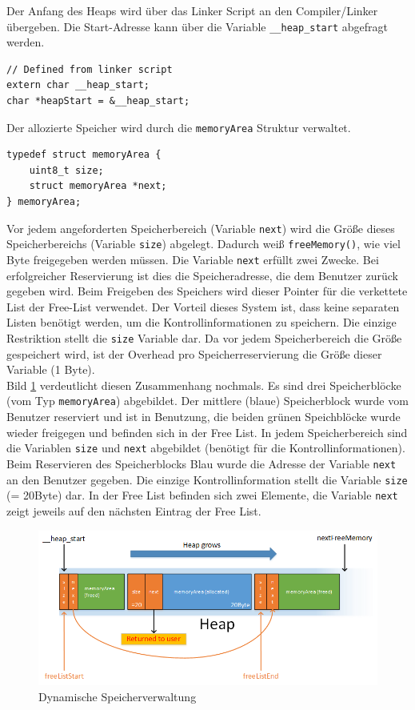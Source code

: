 \documentclass[fontsize=12pt, toc=bibliography, notitlepage]{scrreprt}
\begin{document}
Der Anfang des Heaps wird über das Linker Script an den Compiler/Linker übergeben. Die Start-Adresse kann über die Variable \lstinline$__heap_start$ abgefragt werden.

\begin{lstlisting}[title=memory.c]
// Defined from linker script
extern char __heap_start;
char *heapStart = &__heap_start;
\end{lstlisting}

Der allozierte Speicher wird durch die \lstinline$memoryArea$ Struktur verwaltet. 

\begin{lstlisting}[title=memory.c]
typedef struct memoryArea {
    uint8_t size;
    struct memoryArea *next;
} memoryArea;
\end{lstlisting}

Vor jedem angeforderten Speicherbereich (Variable \lstinline$next$) wird die Größe dieses Speicherbereichs (Variable \lstinline$size$) abgelegt. Dadurch weiß \lstinline$freeMemory()$, wie viel Byte freigegeben werden müssen. Die Variable \lstinline$next$ erfüllt zwei Zwecke. Bei erfolgreicher Reservierung ist dies die Speicheradresse, die dem Benutzer zurück gegeben wird. Beim Freigeben des Speichers wird dieser Pointer für die verkettete List der Free-List verwendet. Der Vorteil dieses System ist, dass keine separaten Listen benötigt werden, um die Kontrollinformationen zu speichern. Die einzige Restriktion stellt die \lstinline$size$ Variable dar. Da vor jedem Speicherbereich die Größe gespeichert wird, ist der Overhead pro Speicherreservierung die Größe dieser Variable (1 Byte). \\

Bild \ref{fig:memory} verdeutlicht diesen Zusammenhang nochmals. Es sind drei Speicherblöcke (vom Typ \lstinline$memoryArea$) abgebildet. Der mittlere (blaue) Speicherblock wurde vom Benutzer reserviert und ist in Benutzung, die beiden grünen Speichblöcke wurde wieder freigegen und befinden sich in der Free List. In jedem Speicherbereich sind die Variablen \lstinline$size$ und \lstinline$next$ abgebildet (benötigt für die Kontrollinformationen). Beim Reservieren des Speicherblocks Blau wurde die Adresse der Variable \lstinline$next$ an den Benutzer gegeben. Die einzige Kontrollinformation stellt die Variable \lstinline$size$ (= 20Byte) dar. In der Free List befinden sich zwei Elemente, die Variable \lstinline$next$ zeigt jeweils auf den nächsten Eintrag der Free List.

\begin{figure}[H]
	\centering
	\includegraphics[width=450px]{images/memory.png}
	\caption{Dynamische Speicherverwaltung}
	\label{fig:memory}
\end{figure}
\end{document}
